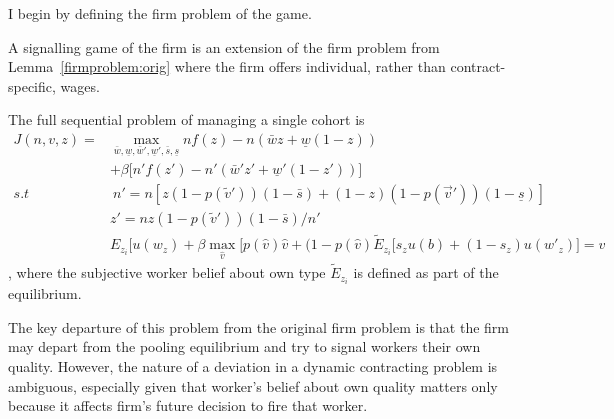 I begin by defining the firm problem of the game.
\begin{definition}\label{app:signalling}
    A signalling game of the firm is an extension of the firm problem from Lemma~\ref{firmproblem:orig} where the firm offers individual, rather than contract-specific, wages.
    
    The full sequential problem of managing a single cohort is 
\begin{equation*}
\begin{split}
J(n,v,z) = & \max_{\bar{w},\underline{w},\bar{w}',\underline{w}',\bar{s},\underline{s}} 
nf(z)-n(\bar{w}z+\underline{w}(1-z)) \\
& +\beta\Big[n'f(z')-n'(\bar{w}'z'+\underline{w}'(1-z'))\Big] \\
s.t & \: n' = n [z(1-p(\tilde{v}'))(1-\bar{s})+(1-z)(1-p(\vec{v}'))(1-\underline{s})] \\
& z'=nz(1-p(\tilde{v}'))(1-\bar{s}) / n' \\
& E_{z_i}\Big[ u(w_{z}) + \beta \max_{\hat{v}}\Big[ p(\hat{v})\hat{v}+(1-p(\hat{v})\tilde{E}_{z_i}[s_{z} u(b) + (1-s_{z})u(w'_z)\Big] = v
\end{split}
\end{equation*}
, where the subjective worker belief about own type $\tilde{E}_{z_i}$ is defined as part of the equilibrium.
\end{definition}
The key departure of this problem from the original firm problem is that the firm may depart from the pooling equilibrium and try to signal workers their own quality. However, the nature of a deviation in a dynamic contracting problem is ambiguous, especially given that worker's belief about own quality matters only because it affects firm's future decision to fire that worker.

